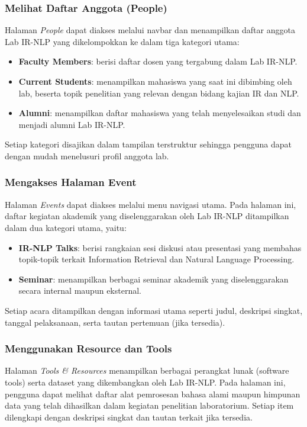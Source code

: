 \subsubsection{Melihat Daftar Anggota (People)}
Halaman \textit{People} dapat diakses melalui navbar dan menampilkan daftar anggota Lab IR-NLP yang dikelompokkan ke dalam tiga kategori utama:
\begin{itemize}
    \item \textbf{Faculty Members}: berisi daftar dosen yang tergabung dalam Lab IR-NLP.
    \item \textbf{Current Students}: menampilkan mahasiswa yang saat ini dibimbing oleh lab, beserta topik penelitian yang relevan dengan bidang kajian IR dan NLP.
    \item \textbf{Alumni}: menampilkan daftar mahasiswa yang telah menyelesaikan studi dan menjadi alumni Lab IR-NLP.
\end{itemize}
Setiap kategori disajikan dalam tampilan terstruktur sehingga pengguna dapat dengan mudah menelusuri profil anggota lab.

\subsubsection{Mengakses Halaman Event}
Halaman \textit{Events} dapat diakses melalui menu navigasi utama. Pada halaman ini, daftar kegiatan akademik yang diselenggarakan oleh Lab IR-NLP ditampilkan dalam dua kategori utama, yaitu:
\begin{itemize}
    \item \textbf{IR-NLP Talks}: berisi rangkaian sesi diskusi atau presentasi yang membahas topik-topik terkait Information Retrieval dan Natural Language Processing.
    \item \textbf{Seminar}: menampilkan berbagai seminar akademik yang diselenggarakan secara internal maupun eksternal.
\end{itemize}
Setiap acara ditampilkan dengan informasi utama seperti judul, deskripsi singkat, tanggal pelaksanaan, serta tautan pertemuan (jika tersedia).

\subsubsection{Menggunakan Resource dan Tools}
Halaman \textit{Tools \& Resources} menampilkan berbagai perangkat lunak (software tools) serta dataset yang dikembangkan oleh Lab IR-NLP. Pada halaman ini, pengguna dapat melihat daftar alat pemrosesan bahasa alami maupun himpunan data yang telah dihasilkan dalam kegiatan penelitian laboratorium. Setiap item dilengkapi dengan deskripsi singkat dan tautan terkait jika tersedia.

